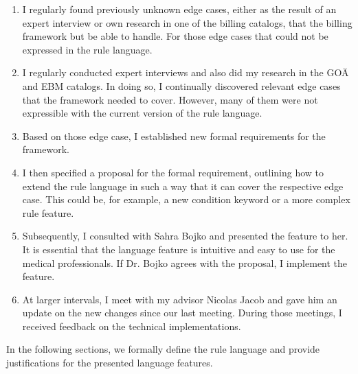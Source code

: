 \begin{enumerate}
    \item I regularly found previously unknown edge cases, either as the result of an expert interview or own research in one of the billing catalogs, that the billing framework but be able to handle.
    For those edge cases that could not be expressed in the rule language.
    \item I regularly conducted expert interviews and also did my research in the GOÄ and EBM catalogs.
    In doing so, I continually discovered relevant edge cases that the framework needed to cover.
    However, many of them were not expressible with the current version of the rule language.
    \item Based on those edge case, I established new formal requirements for the framework.
    \item I then specified a proposal for the formal requirement, outlining how to extend the rule language in such a way that it can cover the respective edge case.
    This could be, for example, a new condition keyword or a more complex rule feature.
    \item Subsequently, I consulted with Sahra Bojko and presented the feature to her.
    It is essential that the language feature is intuitive and easy to use for the medical professionals.
    If Dr. Bojko agrees with the proposal, I implement the feature.
    \item At larger intervals, I meet with my advisor Nicolas Jacob and gave him an update on the new changes since our last meeting.
    During those meetings, I received feedback on the technical implementations.
\end{enumerate}

In the following sections, we formally define the rule language and provide justifications for the presented language features.






